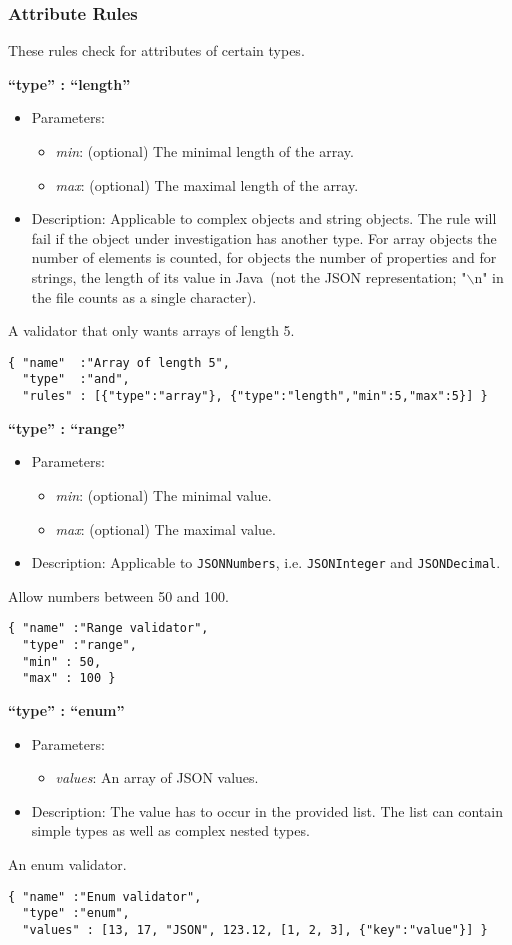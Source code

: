 \documentclass[a4paper]{article}
\newcommand{\ruledef}[3]{
\medskip
\textbf{#1}

\begin{itemize}
\setlength{\itemsep}{1pt}
\setlength{\parskip}{0pt}
\setlength{\parsep}{0pt}
   \item Parameters: #2
   \item Description: #3
\end{itemize}
}
\newcommand{\rulename}[1]{\textbf{``type'' : ``#1''}}
\newcommand{\java}{Java}
\newcommand{\param}[1]{\textsl{#1}:}
\begin{document}
\subsubsection{ Attribute Rules }

These rules check for attributes of certain types.

\ruledef{\rulename{length}}{
\begin{itemize}
   \item \param{min} (optional) The minimal length of the array.
   \item \param{max} (optional) The maximal length of the array.
\end{itemize}} {
Applicable to complex objects and string objects. The rule will fail if the object under investigation has another type. For array objects the number of elements is counted, for objects the number of properties and for strings, the length of its value in \java\ (not the JSON representation; "$\backslash$n" in the file counts as a single character).}

A validator that only wants arrays of length 5.
\begin{lstlisting}
{ "name"  :"Array of length 5",
  "type"  :"and",
  "rules" : [{"type":"array"}, {"type":"length","min":5,"max":5}] }
\end{lstlisting}

\ruledef{\rulename{range}}{\begin{itemize} \item \param{min} (optional) The minimal value.\item \param{max} (optional) The maximal value.\end{itemize}}{Applicable to \lstinline{JSONNumbers}, i.e. \lstinline{JSONInteger} and \lstinline{JSONDecimal}.}

Allow numbers between 50 and 100.
\begin{lstlisting}
{ "name" :"Range validator",
  "type" :"range",
  "min" : 50,
  "max" : 100 }
\end{lstlisting}

\ruledef{\rulename{enum}}{\begin{itemize} \item \param{values} An array of JSON values. \end{itemize}}{The value has to occur in the provided list. The list can contain simple types as well as complex nested types.}

An enum validator.
\begin{lstlisting}
{ "name" :"Enum validator",
  "type" :"enum",
  "values" : [13, 17, "JSON", 123.12, [1, 2, 3], {"key":"value"}] }
\end{lstlisting}
\end{document}
